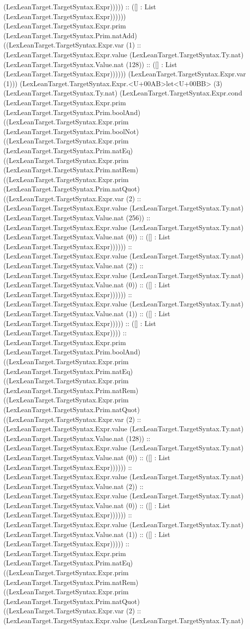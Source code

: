 \documentclass[11pt]{article}
\begin{document}
(LexLeanTarget.TargetSyntax.Expr))))) :: ([] : List (LexLeanTarget.TargetSyntax.Expr)))))) (LexLeanTarget.TargetSyntax.Expr.prim (LexLeanTarget.TargetSyntax.Prim.natAdd) ((LexLeanTarget.TargetSyntax.Expr.var (1) :: (LexLeanTarget.TargetSyntax.Expr.value (LexLeanTarget.TargetSyntax.Ty.nat) (LexLeanTarget.TargetSyntax.Value.nat (128)) :: ([] : List (LexLeanTarget.TargetSyntax.Expr)))))) (LexLeanTarget.TargetSyntax.Expr.var (1))) (LexLeanTarget.TargetSyntax.Expr.<U+00AB>let<U+00BB> (3) (LexLeanTarget.TargetSyntax.Ty.nat) (LexLeanTarget.TargetSyntax.Expr.cond (LexLeanTarget.TargetSyntax.Expr.prim (LexLeanTarget.TargetSyntax.Prim.boolAnd) ((LexLeanTarget.TargetSyntax.Expr.prim (LexLeanTarget.TargetSyntax.Prim.boolNot) ((LexLeanTarget.TargetSyntax.Expr.prim (LexLeanTarget.TargetSyntax.Prim.natEq) ((LexLeanTarget.TargetSyntax.Expr.prim (LexLeanTarget.TargetSyntax.Prim.natRem) ((LexLeanTarget.TargetSyntax.Expr.prim (LexLeanTarget.TargetSyntax.Prim.natQuot) ((LexLeanTarget.TargetSyntax.Expr.var (2) :: (LexLeanTarget.TargetSyntax.Expr.value (LexLeanTarget.TargetSyntax.Ty.nat) (LexLeanTarget.TargetSyntax.Value.nat (256)) :: (LexLeanTarget.TargetSyntax.Expr.value (LexLeanTarget.TargetSyntax.Ty.nat) (LexLeanTarget.TargetSyntax.Value.nat (0)) :: ([] : List (LexLeanTarget.TargetSyntax.Expr)))))) :: (LexLeanTarget.TargetSyntax.Expr.value (LexLeanTarget.TargetSyntax.Ty.nat) (LexLeanTarget.TargetSyntax.Value.nat (2)) :: (LexLeanTarget.TargetSyntax.Expr.value (LexLeanTarget.TargetSyntax.Ty.nat) (LexLeanTarget.TargetSyntax.Value.nat (0)) :: ([] : List (LexLeanTarget.TargetSyntax.Expr)))))) :: (LexLeanTarget.TargetSyntax.Expr.value (LexLeanTarget.TargetSyntax.Ty.nat) (LexLeanTarget.TargetSyntax.Value.nat (1)) :: ([] : List (LexLeanTarget.TargetSyntax.Expr))))) :: ([] : List (LexLeanTarget.TargetSyntax.Expr)))) :: (LexLeanTarget.TargetSyntax.Expr.prim (LexLeanTarget.TargetSyntax.Prim.boolAnd) ((LexLeanTarget.TargetSyntax.Expr.prim (LexLeanTarget.TargetSyntax.Prim.natEq) ((LexLeanTarget.TargetSyntax.Expr.prim (LexLeanTarget.TargetSyntax.Prim.natRem) ((LexLeanTarget.TargetSyntax.Expr.prim (LexLeanTarget.TargetSyntax.Prim.natQuot) ((LexLeanTarget.TargetSyntax.Expr.var (2) :: (LexLeanTarget.TargetSyntax.Expr.value (LexLeanTarget.TargetSyntax.Ty.nat) (LexLeanTarget.TargetSyntax.Value.nat (128)) :: (LexLeanTarget.TargetSyntax.Expr.value (LexLeanTarget.TargetSyntax.Ty.nat) (LexLeanTarget.TargetSyntax.Value.nat (0)) :: ([] : List (LexLeanTarget.TargetSyntax.Expr)))))) :: (LexLeanTarget.TargetSyntax.Expr.value (LexLeanTarget.TargetSyntax.Ty.nat) (LexLeanTarget.TargetSyntax.Value.nat (2)) :: (LexLeanTarget.TargetSyntax.Expr.value (LexLeanTarget.TargetSyntax.Ty.nat) (LexLeanTarget.TargetSyntax.Value.nat (0)) :: ([] : List (LexLeanTarget.TargetSyntax.Expr)))))) :: (LexLeanTarget.TargetSyntax.Expr.value (LexLeanTarget.TargetSyntax.Ty.nat) (LexLeanTarget.TargetSyntax.Value.nat (1)) :: ([] : List (LexLeanTarget.TargetSyntax.Expr))))) :: (LexLeanTarget.TargetSyntax.Expr.prim (LexLeanTarget.TargetSyntax.Prim.natEq) ((LexLeanTarget.TargetSyntax.Expr.prim (LexLeanTarget.TargetSyntax.Prim.natRem) ((LexLeanTarget.TargetSyntax.Expr.prim (LexLeanTarget.TargetSyntax.Prim.natQuot) ((LexLeanTarget.TargetSyntax.Expr.var (2) :: (LexLeanTarget.TargetSyntax.Expr.value (LexLeanTarget.TargetSyntax.Ty.nat) 
\end{document}
